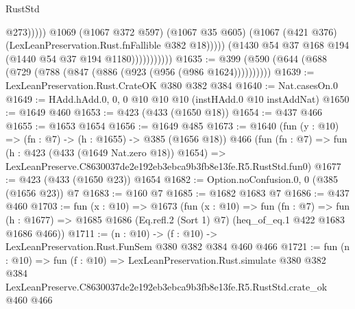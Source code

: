 \begin{lexlean}{RustStd}
\begin{coremodule}
                                      @273)))))
                            @1069
                            (@1067 @372 @597)
                            (@1067 @35 @605)
                            (@1067 (@421 @376) (LexLeanPreservation.Rust.fnFallible @382 @18)))))
                      (@1430 @54 @37 @168 @194 (@1440 @54 @37 @194 @1180)))))))))))
@1635 := @399 (@590 (@644 (@688 (@729 (@788 (@847 (@886 (@923 (@956 (@986 @1624))))))))))
@1639 := LexLeanPreservation.Rust.CrateOK @380 @382 @384
@1640 := Nat.casesOn.{0}
@1649 := HAdd.hAdd.{0, 0, 0} @10 @10 @10 (instHAdd.{0} @10 instAddNat)
@1650 := @1649 @460
@1653 := @423 (@433 (@1650 @18))
@1654 := @437 @466
@1655 := @1653 @1654
@1656 := @1649 @485
@1673 := @1640
    (fun (y : @10) => (fn : @7) -> (h : @1655) -> @385 (@1656 @18))
    @466
    (fun (fn : @7) =>
    fun (h : @423 (@433 (@1649 Nat.zero @18)) @1654) =>
    LexLeanPreserve.C8630037de2e192eb3ebca9b3fb8e13fe.R5.RustStd.fun0)
@1677 := @423 (@433 (@1650 @23)) @1654
@1682 := Option.noConfusion.{0, 0} (@385 (@1656 @23)) @7
@1683 := @160 @7
@1685 := @1682 @1683 @7
@1686 := @437 @460
@1703 := fun (x : @10) =>
  @1673
    (fun (x : @10) =>
    fun (fn : @7) =>
    fun (h : @1677) => @1685 @1686 (Eq.refl.{2} (Sort 1) @7) (heq_of_eq.{1} @422 @1683 @1686 @466))
@1711 := (n : @10) -> (f : @10) -> LexLeanPreservation.Rust.FunSem @380 @382 @384 @460 @466
@1721 := fun (n : @10) =>
  fun (f : @10) =>
  LexLeanPreservation.Rust.simulate
    @380
    @382
    @384
    LexLeanPreserve.C8630037de2e192eb3ebca9b3fb8e13fe.R5.RustStd.crate_ok
    @460
    @466
\end{coremodule}
\end{lexlean}
